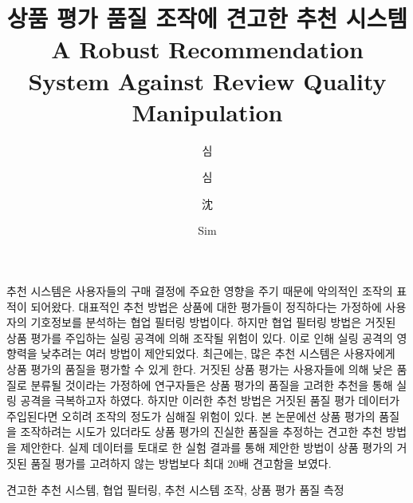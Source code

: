 \documentclass[master,english,final]{kaist-ucs}
\title[korean] {상품 평가 품질 조작에 견고한 추천 시스템}
\title[english]{A Robust Recommendation System \linebreak Against Review Quality Manipulation}
\author[korean] {심}{동 진}
\author[korean2] {심}{동진}    %
\author[chinese]{沈}{東 鎭}
\author[english]{Sim}{Dongjin}
\begin{document}

   \thesisinfo
    \begin{summary}
    추천 시스템은 사용자들의 구매 결정에 주요한 영향을 주기 때문에 악의적인 조작의 표적이 되어왔다.
    대표적인 추천 방법은 상품에 대한 평가들이 정직하다는 가정하에 사용자의 기호정보를 분석하는 협업 필터링 방법이다.
    하지만 협업 필터링 방법은 거짓된 상품 평가를 주입하는 실링 공격에 의해 조작될 위험이 있다.
    이로 인해 실링 공격의 영향력을 낮추려는 여러 방법이 제안되었다.
    최근에는, 많은 추천 시스템은 사용자에게 상품 평가의 품질을 평가할 수 있게 한다.
    거짓된 상품 평가는 사용자들에 의해 낮은 품질로 분류될 것이라는 가정하에 연구자들은 상품 평가의 품질을 고려한 추천을 통해 실링 공격을 극복하고자 하였다.
    하지만 이러한 추천 방법은 거짓된 품질 평가 데이터가 주입된다면 오히려 조작의 정도가 심해질 위험이 있다.
    본 논문에선 상품 평가의 품질을 조작하려는 시도가 있더라도 상품 평가의 진실한 품질을 추정하는 견고한 추천 방법을 제안한다.
    실제 데이터를 토대로 한 실험 결과를 통해 제안한 방법이 상품 평가의 거짓된 품질 평가를 고려하지 않는 방법보다 최대 20배 견고함을 보였다.
    \end{summary}

    \begin{Korkeyword}
    견고한 추천 시스템, 협업 필터링, 추천 시스템 조작, 상품 평가 품질 측정
    \end{Korkeyword}
\end{document}
